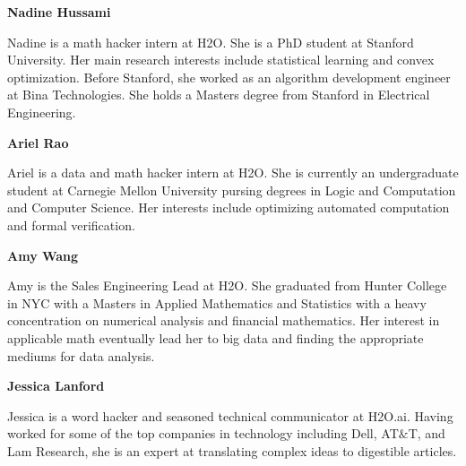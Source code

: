 \textbf{Nadine Hussami}

Nadine is a math hacker intern at H2O. She is a PhD student at Stanford University. Her main research interests include statistical learning and convex optimization. Before Stanford, she worked as an algorithm development engineer at Bina Technologies. She holds a Masters degree from Stanford in Electrical Engineering. 

\textbf{Ariel Rao}

Ariel is a data and math hacker intern at H2O. She is currently an undergraduate student at Carnegie Mellon University pursing degrees in Logic and Computation and Computer Science. Her interests include optimizing automated computation and formal verification.

\textbf{Amy Wang}

Amy is the Sales Engineering Lead at H2O. She graduated from Hunter College in NYC with a Masters in Applied Mathematics and Statistics with a heavy concentration on numerical analysis and financial mathematics. Her interest in applicable math eventually lead her to big data and finding the appropriate mediums for data analysis.

\textbf{Jessica Lanford}

Jessica is a word hacker and seasoned technical communicator at H2O.ai. Having worked for some of the top companies in technology including Dell, AT$\&$T, and Lam Research, she is an expert at translating complex ideas to digestible articles.


